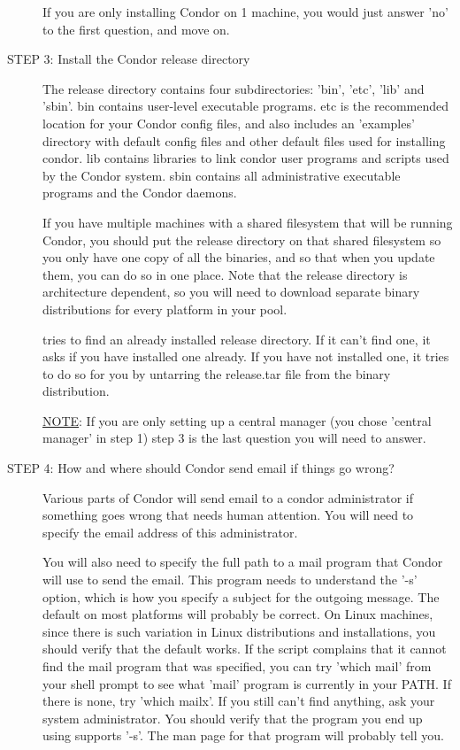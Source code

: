 \begin{description}
     If you are only installing Condor on 1 machine, you would just
     answer 'no' to the first question, and move on.

\item[STEP 3: Install the Condor release directory] 
     The release directory contains four subdirectories: 'bin', 'etc',
     'lib' and 'sbin'.  bin contains user-level executable programs.
     etc is the recommended location for your Condor config files, and
     also includes an 'examples' directory with default config files
     and other default files used for installing condor.  lib contains
     libraries to link condor user programs and scripts used by the
     Condor system.  sbin contains all administrative executable
     programs and the Condor daemons.  

     If you have multiple machines with a shared filesystem that will
     be running Condor, you should put the release directory on that
     shared filesystem so you only have one copy of all the binaries,
     and so that when you update them, you can do so in one place.
     Note that the release directory is architecture dependent, so you
     will need to download separate binary distributions for every
     platform in your pool.

      tries to find an already installed release
     directory.  If it can't find one, it asks if you have installed
     one already.  If you have not installed one, it tries to do so
     for you by untarring the release.tar file from the binary
     distribution.  

\underline{NOTE}: If you are only setting up a central manager (you chose 'central
     manager' in step 1) step 3 is the last question you will need to
     answer.

\item[STEP 4: How and where should Condor send email if things go wrong?]

     Various parts of Condor will send email to a condor administrator
     if something goes wrong that needs human attention.  You will
     need to specify the email address of this administrator.  

     You will also need to specify the full path to a mail program
     that Condor will use to send the email.  This program needs to
     understand the '-s' option, which is how you specify a subject
     for the outgoing message.  The default on most platforms will
     probably be correct.  On Linux machines, since there is such
     variation in Linux distributions and installations, you should
     verify that the default works.  If the script complains that it
     cannot find the mail program that was specified, you can try
     'which mail' from your shell prompt to see what 'mail' program is
     currently in your PATH.  If there is none, try 'which mailx'.  If
     you still can't find anything, ask your system administrator.
     You should verify that the program you end up using supports
     '-s'.  The man page for that program will probably tell you.


\end{description}
